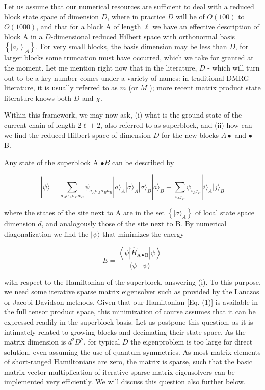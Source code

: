 \documentclass[12pt]{article}
\begin{document}
Let us assume that our numerical resources are sufficient to deal with a reduced block state space of dimension $D$, where in practice $D$ will be of $O(100)$ to $O(1000)$, and that for a block A of length $\ell$ we have an effective description of block $\mathrm{A}$ in a $D$-dimensional reduced Hilbert space with orthonormal basis $\left\{\left|a_{\ell}\right\rangle_{A}\right\}$. For very small blocks, the basis dimension may be less than $D$, for larger blocks some truncation must have occurred, which we take for granted at the moment. Let me mention right now that in the literature, $D$ - which will turn out to be a key number comes under a variety of names: in traditional DMRG literature, it is usually referred to as $m$ (or $M$ ); more recent matrix product state literature knows both $D$ and $\chi$.

Within this framework, we may now ask, (i) what is the ground state of the current chain of length $2 \ell+2$, also referred to as superblock, and (ii) how can we find the reduced Hilbert space of dimension $D$ for the new blocks $A \bullet$ and $\bullet$ B.

Any state of the superblock A $\bullet B$ can be described by


\begin{equation*}
|\psi\rangle=\sum_{a_{A} \sigma_{A} \sigma_{B} a_{B}} \psi_{a_{A} \sigma_{A} \sigma_{B} a_{B}}|a\rangle_{A}|\sigma\rangle_{A}|\sigma\rangle_{B}|a\rangle_{B} \equiv \sum_{i_{A} j_{B}} \psi_{i_{A} j_{B}}|i\rangle_{A}|j\rangle_{B} \tag{2}
\end{equation*}


where the states of the site next to A are in the set $\left\{|\sigma\rangle_{A}\right\}$ of local state space dimension $d$, and analogously those of the site next to B. By numerical diagonalization we find the $|\psi\rangle$ that minimizes the energy


\begin{equation*}
E=\frac{\left\langle\psi\left|\hat{H}_{\mathrm{A} \bullet \mathrm{B}}\right| \psi\right\rangle}{\langle\psi \mid \psi\rangle} \tag{3}
\end{equation*}


with respect to the Hamiltonian of the superblock, answering (i). To this purpose, we need some iterative sparse matrix eigensolver such as provided by the Lanczos or Jacobi-Davidson methods. Given that our Hamiltonian [Eq. (1)] is available in the full tensor product space, this minimization of course assumes that it can be expressed readily in the superblock basis. Let us postpone this question, as it is intimately related to growing blocks and decimating their state space. As the matrix dimension is $d^{2} D^{2}$, for typical $D$ the eigenproblem is too large for direct solution, even assuming the use of quantum symmetries. As most matrix elements of short-ranged Hamiltonians are zero, the matrix is sparse, such that the basic matrix-vector multiplication of iterative sparse matrix eigensolvers can be implemented very efficiently. We will discuss this question also further below.
\end{document}
